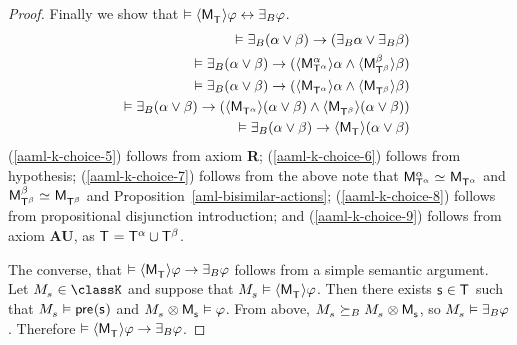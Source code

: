 \begin{proof}
Finally we show that $\entails \actionE{\aPModel{\aStatesT}} \phi \iff \someactsBs \phi$.
\begin{eqnarray}
    &&\entails \someactsBs (\alpha \lor \beta) \implies (\someactsBs \alpha \lor \someactsBs \beta) \label{aaml-k-choice-5}\\
    &&\entails \someactsBs (\alpha \lor \beta) \implies (\actionE{\aPModel[\alpha]{\aStatesT[\alpha]}} \alpha \land \actionE{\aPModel[\beta]{\aStatesT[\beta]}} \beta) \label{aaml-k-choice-6}\\
    &&\entails \someactsBs (\alpha \lor \beta) \implies (\actionE{\aPModel{\aStatesT[\alpha]}} \alpha \land \actionE{\aPModel{\aStatesT[\beta]}} \beta) \label{aaml-k-choice-7}\\
    &&\entails \someactsBs (\alpha \lor \beta) \implies (\actionE{\aPModel{\aStatesT[\alpha]}} (\alpha \lor \beta) \land \actionE{\aPModel{\aStatesT[\beta]}} (\alpha \lor \beta)) \label{aaml-k-choice-8}\\
    &&\entails \someactsBs (\alpha \lor \beta) \implies \actionE{\aPModel{\aStatesT}} (\alpha \lor \beta) \label{aaml-k-choice-9}
\end{eqnarray}
(\ref{aaml-k-choice-5}) follows from \axiomAamlK{} axiom {\bf R};
(\ref{aaml-k-choice-6}) follows from hypothesis;
(\ref{aaml-k-choice-7}) follows from the above note that $\aPModel[\alpha]{\aStatesT[\alpha]} \bisimilar \aPModel{\aStatesT[\alpha]}$ and $\aPModel[\beta]{\aStatesT[\beta]} \bisimilar \aPModel{\aStatesT[\beta]}$ and Proposition~\ref{aml-bisimilar-actions};
(\ref{aaml-k-choice-8}) follows from propositional disjunction introduction; and
(\ref{aaml-k-choice-9}) follows from \axiomAamlK{} axiom {\bf AU}, as $\aStatesT = \aStatesT[\alpha] \cup \aStatesT[\beta]$.

The converse, that $\entails \actionE{\aPModel{\aStatesT}} \phi \implies \someactsBs \phi$ follows from a simple semantic argument.
Let $\kPModel{\kStateS} \in \classK$ and suppose that $\kPModel{\kStateS} \entails \actionE{\aPModel{\aStatesT}} \phi$.
Then there exists $\aStateS \in \aStatesT$ such that $\kPModel{\kStateS} \entails \aPrecondition(\aStateS)$ and $\kPModel{\kStateS} \exec \aPModel{\aStateS} \entails \phi$.
From above, $\kPModel{\kStateS} \simulatesBs \kPModel{\kStateS} \exec \aPModel{\aStateS}$, so $\kPModel{\kStateS} \entails \someactsBs \phi$.
Therefore $\entails \actionE{\aPModel{\aStatesT}} \phi \implies \someactsBs \phi$.
\end{proof}

